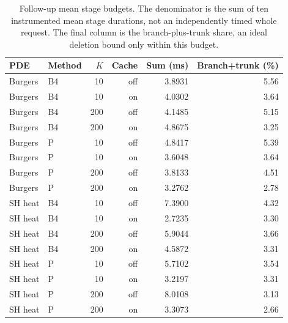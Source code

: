 \begin{table}[ht]
\centering\small
\caption{Follow-up mean stage budgets. The denominator is the sum of ten instrumented mean stage durations, not an independently timed whole request. The final column is the branch-plus-trunk share, an ideal deletion bound only within this budget.}
\begin{tabular}{@{}llrrrr@{}}\toprule
PDE & Method & $K$ & Cache & Sum (ms) & Branch+trunk (\%)\\\midrule
Burgers & B4 & 10 & off & 3.8931 & 5.56\\
Burgers & B4 & 10 & on & 4.0302 & 3.64\\
Burgers & B4 & 200 & off & 4.1485 & 5.15\\
Burgers & B4 & 200 & on & 4.8675 & 3.25\\
Burgers & P & 10 & off & 4.8417 & 5.39\\
Burgers & P & 10 & on & 3.6048 & 3.64\\
Burgers & P & 200 & off & 3.8133 & 4.51\\
Burgers & P & 200 & on & 3.2762 & 2.78\\
SH heat & B4 & 10 & off & 7.3900 & 4.32\\
SH heat & B4 & 10 & on & 2.7235 & 3.30\\
SH heat & B4 & 200 & off & 5.9044 & 3.66\\
SH heat & B4 & 200 & on & 4.5872 & 3.31\\
SH heat & P & 10 & off & 5.7102 & 3.54\\
SH heat & P & 10 & on & 3.2197 & 3.31\\
SH heat & P & 200 & off & 8.0108 & 3.13\\
SH heat & P & 200 & on & 3.3073 & 2.66\\
\bottomrule\end{tabular}
\end{table}
